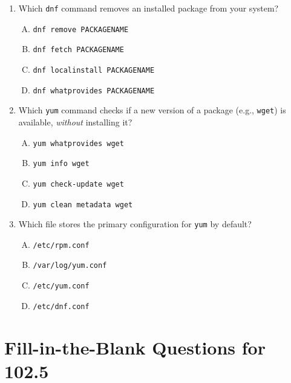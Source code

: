 \documentclass[a4paper]{report}
\begin{document}
\begin{enumerate}[1.]
    \item Which \texttt{dnf} command removes an installed package from your system?  
    \begin{enumerate}[A)]
        \item \texttt{dnf remove PACKAGENAME}  
        \item \texttt{dnf fetch PACKAGENAME}  
        \item \texttt{dnf localinstall PACKAGENAME}  
        \item \texttt{dnf whatprovides PACKAGENAME}  
    \end{enumerate}

    \item Which \texttt{yum} command checks if a new version of a package (e.g., \texttt{wget}) is available, \emph{without} installing it?  
    \begin{enumerate}[A)]
        \item \texttt{yum whatprovides wget}  
        \item \texttt{yum info wget}  
        \item \texttt{yum check-update wget}  
        \item \texttt{yum clean metadata wget}  
    \end{enumerate}

    \item Which file stores the primary configuration for \texttt{yum} by default?  
    \begin{enumerate}[A)]
        \item \texttt{/etc/rpm.conf}  
        \item \texttt{/var/log/yum.conf}  
        \item \texttt{/etc/yum.conf}  
        \item \texttt{/etc/dnf.conf}  
    \end{enumerate}

\end{enumerate}



\newpage
\section*{Fill-in-the-Blank Questions for 102.5}
\end{document}
